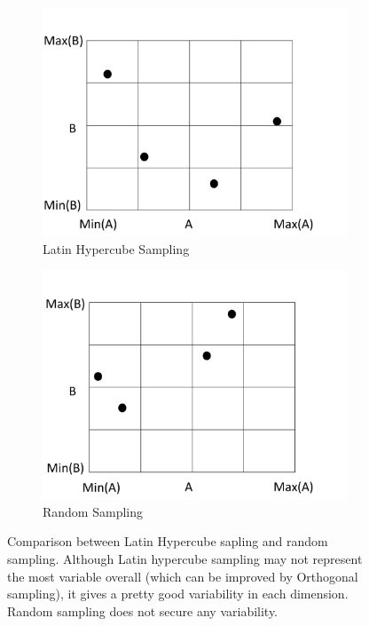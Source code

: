 \documentclass[11pt]{report}
\numberwithin{equation}{chapter}
\begin{document}
\begin{spacing}{2}
\begin{figure}
\begin{subfigure}{0.5\textwidth}
\centering
\includegraphics[scale = 0.3]{LHS.pdf}
\caption{Latin Hypercube Sampling}
\end{subfigure}
\begin{subfigure}{0.5\textwidth}
\centering
\includegraphics[scale = 0.3]{RS.pdf}
\caption{Random Sampling}
\end{subfigure}
\caption{Comparison between Latin Hypercube sapling and random sampling. Although Latin hypercube sampling may not represent the most variable overall (which can be improved by Orthogonal sampling), it gives a pretty good variability in each dimension. Random sampling does not secure any variability. }
\end{figure}




\end{spacing}
\end{document}
